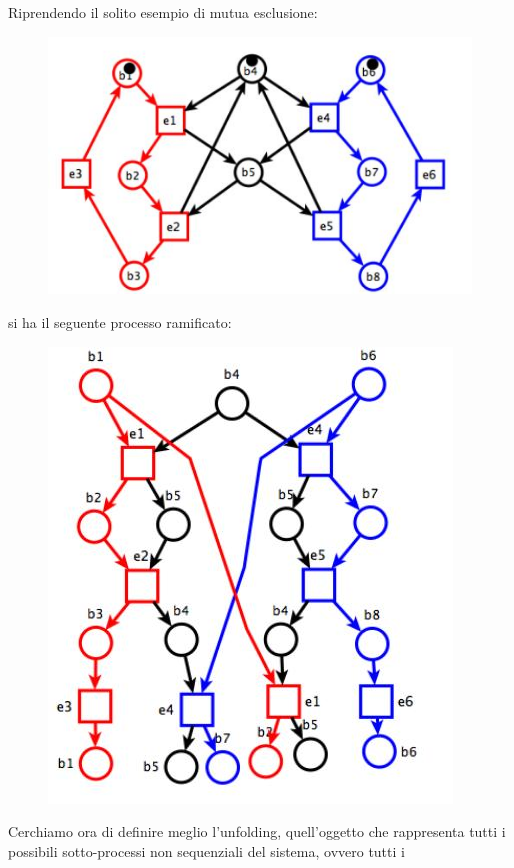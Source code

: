 \begin{esempio}
  Riprendendo il solito esempio di mutua esclusione:
  \begin{figure}[H]
    \centering
    \includegraphics[scale = 0.45]{img/ram0.jpg} 
  \end{figure}
  \newpage
  si ha il seguente processo ramificato:
  \begin{figure}[H]
    \centering
    \includegraphics[scale = 0.45]{img/ram.jpg} 
  \end{figure}
  
\end{esempio}
\noindent
Cerchiamo ora di definire meglio l'unfolding, quell'oggetto che rappresenta
tutti i possibili sotto-processi non sequenziali del sistema, ovvero tutti i
